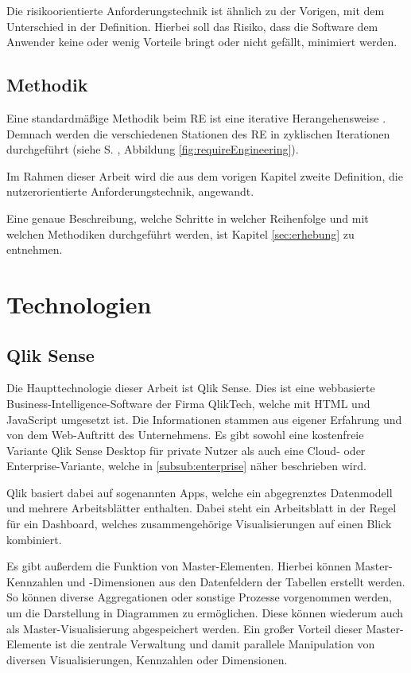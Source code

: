 Die risikoorientierte Anforderungstechnik ist ähnlich zu der Vorigen, mit dem Unterschied in der Definition.
Hierbei soll das Risiko, dass die Software dem Anwender keine oder wenig Vorteile bringt oder nicht gefällt, minimiert werden.

\subsection{Methodik}
\label{sub:methodik}
Eine standardmäßige Methodik beim \gls{RE} ist eine iterative Herangehensweise \cite{Pohl.2011}.
Demnach werden die verschiedenen Stationen des \gls{RE} in zyklischen Iterationen durchgeführt (siehe S. \pageref{fig:requireEngineering}, Abbildung \ref{fig:requireEngineering}).

Im Rahmen dieser Arbeit wird die aus dem vorigen Kapitel zweite Definition, die nutzerorientierte Anforderungstechnik, angewandt. 

Eine genaue Beschreibung, welche Schritte in welcher Reihenfolge und mit welchen Methodiken durchgeführt werden, ist Kapitel \ref{sec:erhebung} zu entnehmen.
 
 
\section{Technologien}
\subsection{Qlik Sense}
\label{sub:qlik}
Die Haupttechnologie dieser Arbeit ist Qlik Sense.
Dies ist eine webbasierte Business-Intelligence-Software der Firma QlikTech, welche mit HTML und JavaScript umgesetzt ist.
Die Informationen stammen aus eigener Erfahrung und von dem Web-Auftritt \cite{QlikTech.2019} des Unternehmens. 
Es gibt sowohl eine kostenfreie Variante Qlik Sense Desktop für private Nutzer als auch eine Cloud- oder Enterprise-Variante, welche in \ref{subsub:enterprise} näher beschrieben wird.

Qlik basiert dabei auf sogenannten \glqq Apps\grqq{}, welche ein abgegrenztes Datenmodell und mehrere Arbeitsblätter enthalten.
Dabei steht ein Arbeitsblatt in der Regel für ein \gls{Dashboard}, welches zusammengehörige Visualisierungen auf einen Blick kombiniert.


Es gibt außerdem die Funktion von Master-Elementen.
Hierbei können Master-Kennzahlen und -Dimensionen aus den Datenfeldern der Tabellen erstellt werden. 
So können diverse Aggregationen oder sonstige Prozesse vorgenommen werden, um die Darstellung in Diagrammen zu ermöglichen.
Diese können wiederum auch als Master-Visualisierung abgespeichert werden.
Ein großer Vorteil dieser Master-Elemente ist die zentrale Verwaltung und damit parallele Manipulation von diversen Visualisierungen, Kennzahlen oder Dimensionen.

